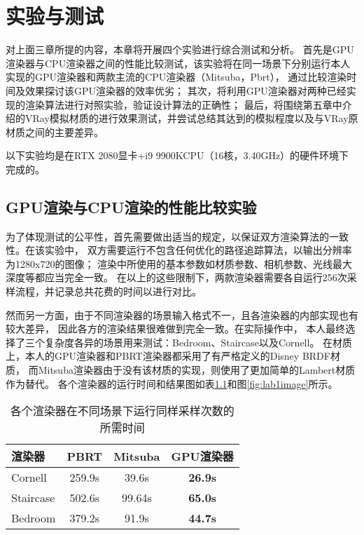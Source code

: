 \chapter{实验与测试}
\label{cha:evaluations}

对上面三章所提的内容，本章将开展四个实验进行综合测试和分析。
首先是GPU渲染器与CPU渲染器之间的性能比较测试，该实验将在同一场景下分别运行本人实现的GPU渲染器和两款主流的CPU渲染器（Mitsuba，Pbrt），
通过比较渲染时间及效果探讨该GPU渲染器的效率优劣；
其次，将利用GPU渲染器对两种已经实现的渲染算法进行对照实验，验证设计算法的正确性；
最后，将围绕第五章中介绍的VRay模拟材质的进行效果测试，并尝试总结其达到的模拟程度以及与VRay原材质之间的主要差异。

以下实验均是在RTX 2080显卡+i9 9900KCPU（16核，3.40GHz）的硬件环境下完成的。

\section{GPU渲染与CPU渲染的性能比较实验}

为了体现测试的公平性，首先需要做出适当的规定，以保证双方渲染算法的一致性。在该实验中，
双方需要运行不包含任何优化的路径追踪算法，以输出分辨率为1280x720的图像；
渲染中所使用的基本参数如材质参数、相机参数、光线最大深度等都应当完全一致。
在以上的这些限制下，两款渲染器需要各自运行256次采样流程，并记录总共花费的时间以进行对比。

然而另一方面，由于不同渲染器的场景输入格式不一，且各渲染器的内部实现也有较大差异，
因此各方的渲染结果很难做到完全一致。在实际操作中，
本人最终选择了三个复杂度各异的场景用来测试：Bedroom、Staircase以及Cornell。
在材质上，本人的GPU渲染器和PBRT渲染器都采用了有严格定义的Disney BRDF材质，
而Mitsuba渲染器由于没有该材质的实现，则使用了更加简单的Lambert材质作为替代。
各个渲染器的运行时间和结果图如表\ref{tab:lab1time}和图\ref{fig:lab1image}所示。

\begin{table}[]
    \centering
    \begin{tabular}{@{}lccc@{}}
    \toprule
    渲染器     &  PBRT & Mitsuba & GPU渲染器 \\ \midrule
    Cornell &   259.9s   &   39.6s   &    \textbf{26.9s}     \\
    Staircase    &   502.6s  &   99.64s  &    \textbf{65.0s}    \\
    Bedroom &   379.2s    &   91.9s    &    \textbf{44.7s}   \\ \bottomrule
    \end{tabular}
    \vspace{2mm}
    \caption{各个渲染器在不同场景下运行同样采样次数的所需时间}
    \label{tab:lab1time}
\end{table}

